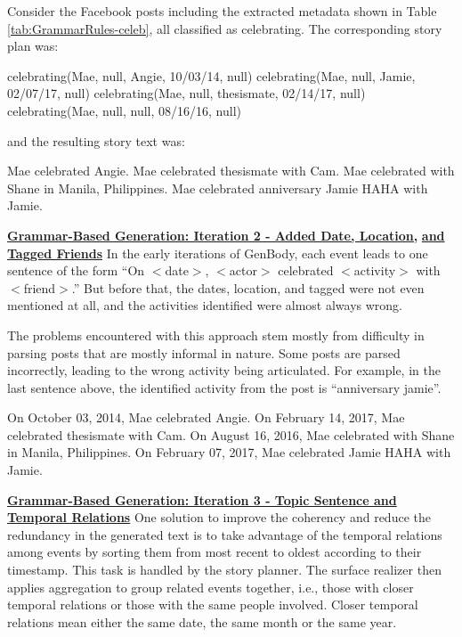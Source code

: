 Consider the Facebook posts including the extracted metadata shown in Table \ref{tab:GrammarRules-celeb}, all classified as celebrating. The corresponding story plan was:

\begin{center} celebrating(Mae, null, Angie, 10/03/14, null) \newline
	celebrating(Mae, null, Jamie, 02/07/17, null) \newline
	celebrating(Mae, null, thesismate, 02/14/17, null) \newline
	celebrating(Mae, null, null, 08/16/16, null) \end{center}

and the resulting story text was: 

\begin{center}Mae celebrated Angie. Mae celebrated thesismate with Cam. Mae celebrated with Shane in Manila, Philippines. Mae celebrated anniversary Jamie HAHA with Jamie. \end{center}

\underline{\textbf{Grammar-Based Generation: Iteration 2 - Added Date, Location,}} \newline \underline{\textbf{and Tagged Friends}} 
\newline
In the early iterations of GenBody, each event leads to one sentence of the form ``On $<$date$>$, $<$actor$>$ celebrated $<$activity$>$ with $<$friend$>$.'' But before that, the dates, location, and tagged were not even mentioned at all, and the activities identified were almost always wrong.

The problems encountered with this approach stem mostly from difficulty in parsing posts that are mostly informal in nature. Some posts are parsed incorrectly, leading to the wrong activity being articulated. For example, in the last sentence above, the identified activity from the post is ``anniversary jamie''.

\begin{center} On October 03, 2014, Mae celebrated Angie. On February 14, 2017, Mae celebrated thesismate with Cam. On August 16, 2016, Mae celebrated with Shane in Manila, Philippines. On February 07, 2017, Mae celebrated Jamie HAHA with Jamie. \end{center}

\underline{\textbf{Grammar-Based Generation: Iteration 3 - Topic Sentence and}}
\newline \underline{\textbf{Temporal Relations}} 
\newline
One solution to improve the coherency and reduce the redundancy in the generated text is to take advantage of the temporal relations among events by sorting them from most recent to oldest according to their timestamp. This task is handled by the story planner. The surface realizer then applies aggregation to group related events together, i.e., those with closer temporal relations or those with the same people involved. Closer temporal relations mean either the same date, the same month or the same year.

